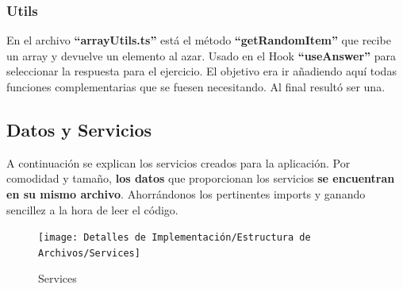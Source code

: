 \documentclass[12pt,twoside,titlepage]{report}
\begin{document}
\subsubsection{Utils}
En el archivo \textbf{``arrayUtils.ts''} está el método \textbf{``getRandomItem''} que recibe un array y devuelve un elemento al azar. Usado en el Hook \textbf{``useAnswer''} para seleccionar la respuesta para el ejercicio. El objetivo era ir añadiendo aquí todas funciones complementarias que se fuesen necesitando. Al final resultó ser una.

\subsection{Datos y Servicios}
A continuación se explican los servicios creados para la aplicación. Por comodidad y tamaño, \textbf{los datos} que proporcionan los servicios \textbf{se encuentran en su mismo archivo}. Ahorrándonos los pertinentes imports y ganando sencillez a la hora de leer el código.

\begin{figure}[H]
    \centering
    \texttt{[image: Detalles de Implementación/Estructura de Archivos/Services]}
    \label{fig:Services}
    \caption{Services}
\end{figure}
\end{document}
